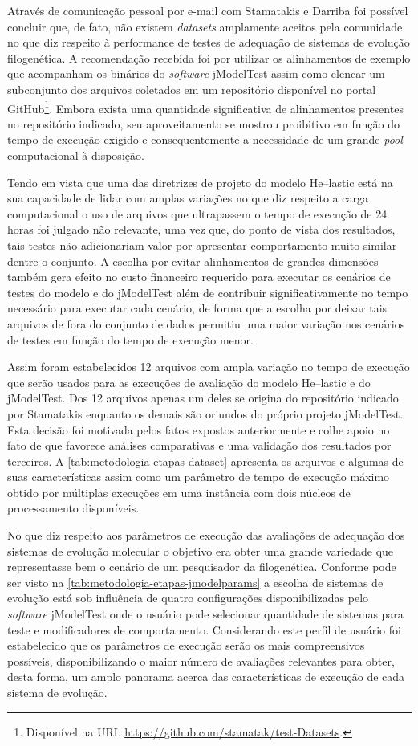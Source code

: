 \documentclass[english,brazilian]{UNISINOSmonografia} %
\begin{document}
Através de comunicação pessoal por e-mail com Stamatakis e Darriba foi possível concluir que, de fato, não existem \textit{datasets} amplamente aceitos pela comunidade no que diz respeito à performance de testes de adequação de sistemas de evolução filogenética.
A recomendação recebida foi por utilizar os alinhamentos de exemplo que acompanham os binários do \textit{software} jModelTest assim como elencar um subconjunto dos arquivos coletados em um repositório disponível no portal GitHub\footnote{
	Disponível na URL \url{https://github.com/stamatak/test-Datasets}.
}.
Embora exista uma quantidade significativa de alinhamentos presentes no repositório indicado, seu aproveitamento se mostrou proibitivo em função do tempo de execução exigido e consequentemente a necessidade de um grande \textit{pool} computacional à disposição.


Tendo em vista que uma das diretrizes de projeto do modelo \textsf{He}--lastic está na sua capacidade de lidar com amplas variações no que diz respeito a carga computacional o uso de arquivos que ultrapassem o tempo de execução de 24 horas foi julgado não relevante, uma vez que, do ponto de vista dos resultados, tais testes não adicionariam valor por apresentar comportamento muito similar dentre o conjunto.
A escolha por evitar alinhamentos de grandes dimensões também gera efeito no custo financeiro requerido para executar os cenários de testes do modelo e do jModelTest além de contribuir significativamente no tempo necessário para executar cada cenário, de forma que a escolha por deixar tais arquivos de fora do conjunto de dados permitiu uma maior variação nos cenários de testes em função do tempo de execução menor.


Assim foram estabelecidos 12 arquivos com ampla variação no tempo de execução que serão usados para as execuções de avaliação do modelo \textsf{He}--lastic e do jModelTest.
Dos 12 arquivos apenas um deles se origina do repositório indicado por Stamatakis enquanto os demais são oriundos do próprio projeto jModelTest.
Esta decisão foi motivada pelos fatos expostos anteriormente e colhe apoio no fato de que favorece análises comparativas e uma validação dos resultados por terceiros.
A \autoref{tab:metodologia-etapas-dataset} apresenta os arquivos e algumas de suas características assim como um parâmetro de tempo de execução máximo obtido por múltiplas execuções em uma instância com dois núcleos de processamento disponíveis.


No que diz respeito aos parâmetros de execução das avaliações de adequação dos sistemas de evolução molecular o objetivo era obter uma grande variedade que representasse bem o cenário de um pesquisador da filogenética.
Conforme pode ser visto na \autoref{tab:metodologia-etapas-jmodelparams} a escolha de sistemas de evolução está sob influência de quatro configurações disponibilizadas pelo \textit{software} jModelTest onde o usuário pode selecionar quantidade de sistemas para teste e modificadores de comportamento.
Considerando este perfil de usuário foi estabelecido que os parâmetros de execução serão os mais compreensivos possíveis, disponibilizando o maior número de avaliações relevantes para obter, desta forma, um amplo panorama acerca das características de execução de cada sistema de evolução.
\end{document}
